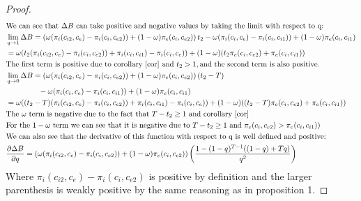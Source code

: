 \begin{proof}
\begin{align*}
&\text{We can see that } \Delta B \text{ can take positive and negative values by taking the limit with respect to q:} \\
&\lim_{q \to 1}\Delta B = \left(\omega (\pi_{i}(c_{i2},c_{e})- \pi_{i}(c_{i},c_{e2}))+(1-\omega)\pi_{e}(c_{i},c_{e2}) \right) t_2
-\omega(\pi_i(c_i,c_{e})-\pi_i(c_i,c_{i1}))+(1-\omega)\pi_e(c_i,c_{i1})
\\
& = \omega (t_2 (\pi_{i}(c_{i2},c_{e})- \pi_{i}(c_{i},c_{e2})) + \pi_i(c_i,c_{i1}) -\pi_i(c_i,c_{e}) ) 
+ (1-\omega)(t_2 \pi_{e}(c_{i},c_{e2}) + \pi_e(c_i,c_{i1}))
\\
& \text{The first term is positive due to corollary \ref{cor} and } t_2>1, \text{and the second term is also positive. } \\
&\lim_{q \to 0}\Delta B = \left(\omega (\pi_{i}(c_{i2},c_{e})- \pi_{i}(c_{i},c_{e2}))+(1-\omega)\pi_{e}(c_{i},c_{e2}) \right) (t_2-T)
\\
& ~~~~~~~~~~~~~  -\omega(\pi_i(c_i,c_{e})-\pi_i(c_i,c_{i1}))+(1-\omega)\pi_e(c_i,c_{i1})
\\
& = \omega ((t_2-T) (\pi_{i}(c_{i2},c_{e})- \pi_{i}(c_{i},c_{e2})) + \pi_i(c_i,c_{i1}) -\pi_i(c_i,c_{e}) ) 
+ (1-\omega)((t_2-T) \pi_{e}(c_{i},c_{e2}) + \pi_e(c_i,c_{i1}))
\\
& \text{The $\omega$ term is negative due to the fact that } T-t_2 \geq 1 \text{ and  corollary \ref{cor}} 
\\
& \text{For the $1-\omega$ term we can see that it is negative due to } T-t_2 \geq 1 \text{ and } \pi_{e}(c_{i},c_{e2})>\pi_e(c_i,c_{i1})) \\
& \text{We can also see that the derivative of this function with respect to q is well defined and positive:} \\
&\frac{\partial \Delta B}{\partial q} = \left(\omega (\pi_{i}(c_{i2},c_{e})- \pi_{i}(c_{i},c_{e2}))+(1-\omega)\pi_{e}(c_{i},c_{e2}) \right) \left(\frac{1-(1-q)^{T-1}((1-q)+T q) }{q^2} \right)
\end{align*}
Where $\pi_{i}(c_{i2},c_{e})- \pi_{i}(c_{i},c_{e2})$ is positive by definition and the larger parenthesis is weakly positive by the same reasoning as in proposition 1. 
\end{proof}
